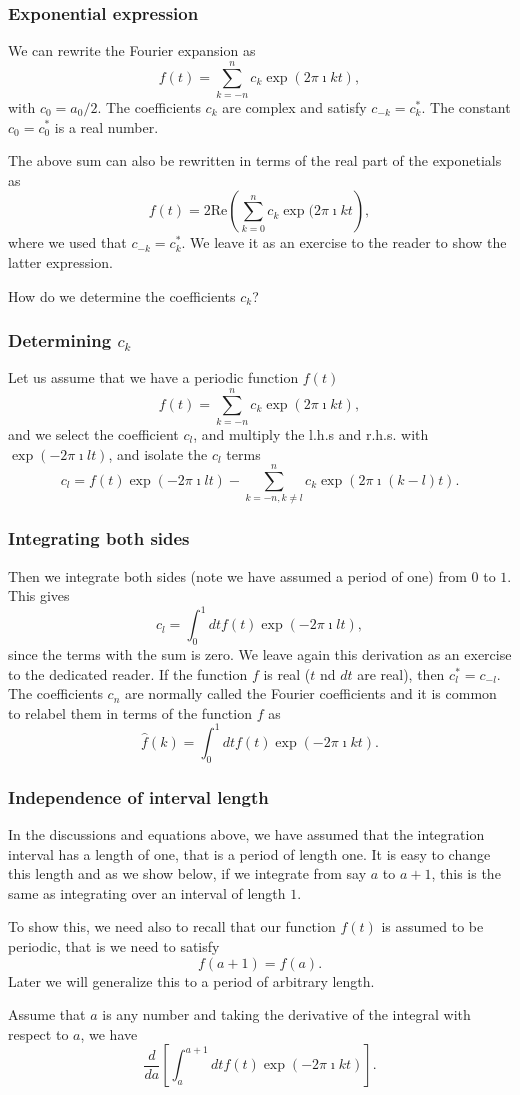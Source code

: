 \documentclass{beamer}
\begin{document}
\begin{frame}
\frametitle{Exponential expression}

We can rewrite the Fourier expansion as
\[
f(t) =\sum_{k=-n}^{n}c_{k}\exp{(2\pi\imath kt)}, 
\]
with $c_0=a_0/2$. The coefficients $c_k$ are complex and satisfy $c_{-k}=c_k^*$.
The constant $c_{0}=c_0^*$ is a real number.

The above sum can also be rewritten in terms of the real part of the exponetials as
\[
f(t) =2\mathrm{Re}\left(\sum_{k=0}^{n}c_{k}\exp{(2\pi\imath kt} \right),
\]
where we used that $c_{-k}=c_k^*$. We leave it as an exercise to the reader to show the latter expression.

How do we determine the coefficients $c_k$?
\end{frame}

\begin{frame}
\frametitle{Determining $c_k$}

Let us assume that we have a periodic function $f(t)$ 
\[
f(t) =\sum_{k=-n}^{n}c_{k}\exp{(2\pi\imath kt)}, 
\]
and we select the coefficient $c_l$, and multiply the l.h.s and r.h.s. with $\exp{(-2\pi\imath lt)}$, and isolate the $c_l$ terms
\[
c_l=f(t)\exp{(-2\pi\imath lt)}-\sum_{k=-n, k\ne l}^{n}c_{k}\exp{(2\pi\imath (k-l)t)}. 
\]
\end{frame}

\begin{frame}
\frametitle{Integrating both sides}

Then we integrate both sides (note we have assumed a period of one) from $0$ to $1$. This gives
\[
c_l=\int_0^1 dtf(t)\exp{(-2\pi\imath lt)},
\]
since the terms with the sum is zero.  We leave again this derivation as an exercise to the dedicated reader.
If the function $f$ is real ($t$ nd $dt$ are real), then $c_l^*=c_{-l}$.
The coefficients $c_n$ are normally called the Fourier coefficients and it is common to relabel them in terms of the function $f$ as
\[
\hat{f}(k)=\int_0^1 dt f(t)\exp{(-2\pi\imath kt)}.
\]
\end{frame}

\begin{frame}
\frametitle{Independence of interval length}

In the discussions and equations above, we have assumed that the
integration interval has a length of one, that is a period of length one. It is easy to change this
length and as we show below, if we integrate from say $a$ to $a+1$, this is the same as integrating over an interval of length $1$.

To show this, we need also to recall that our function $f(t)$ is assumed to be periodic, that is we need to satisfy
\[
f(a+1)=f(a).
\]
Later we will generalize this to a period of arbitrary length.

Assume that $a$ is any number and taking the derivative of the integral with respect to $a$, we have
\[
\frac{d}{da}\left[\int_a^{a+1} dt f(t)\exp{(-2\pi\imath kt)}\right]. 
\]
\end{frame}
\end{document}

